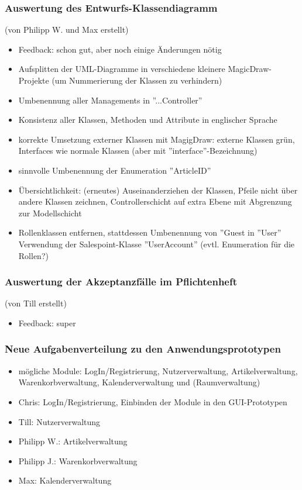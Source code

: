 \documentclass[12pt,a4paper]{article}
\begin{document}
\subsubsection*{Auswertung des Entwurfs-Klassendiagramm}
(von Philipp W. und Max erstellt)
\begin{itemize}
\item Feedback: schon gut, aber noch einige Änderungen nötig
\item Aufsplitten der UML-Diagramme in verschiedene kleinere MagicDraw-Projekte (um Nummerierung der Klassen zu verhindern)
\item Umbenennung aller Managements in ''...Controller''
\item Konsistenz aller Klassen, Methoden und Attribute in englischer Sprache
\item korrekte Umsetzung externer Klassen mit MagigDraw: externe Klassen grün, Interfaces wie normale Klassen  (aber mit ''interface''-Bezeichnung)
\item sinnvolle Umbenennung der Enumeration ''ArticleID''
\item Übersichtlichkeit: (erneutes) Auseinanderziehen der Klassen, Pfeile nicht über andere Klassen zeichnen, Controllerschicht auf extra Ebene mit Abgrenzung zur Modellschicht
\item Rollenklassen entfernen, stattdessen Umbenennung von ''Guest in ''User'' Verwendung der Salespoint-Klasse ''UserAccount'' (evtl. Enumeration für die Rollen?)
\end{itemize}

\subsubsection*{Auswertung der Akzeptanzfälle im Pflichtenheft}
(von Till erstellt)
\begin{itemize}
\item Feedback: super
\end{itemize}

\subsubsection*{Neue Aufgabenverteilung zu den Anwendungsprototypen}
\begin{itemize}
\item mögliche Module: LogIn/Registrierung, Nutzerverwaltung, Artikelverwaltung, Warenkorbverwaltung, Kalenderverwaltung und (Raumverwaltung)
\item Chris: LogIn/Registrierung, Einbinden der Module in den GUI-Prototypen
\item Till: Nutzerverwaltung
\item Philipp W.: Artikelverwaltung
\item Philipp J.: Warenkorbverwaltung
\item Max: Kalenderverwaltung
\end{itemize}
\end{document}
